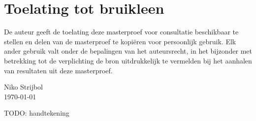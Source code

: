 \chapter*{Toelating tot bruikleen}

De auteur geeft de toelating deze masterproef voor consultatie beschikbaar te stellen en delen van de masterproef te kopiëren voor persoonlijk gebruik.
Elk ander gebruik valt onder de bepalingen van het auteursrecht, in het bijzonder met betrekking tot de verplichting de bron uitdrukkelijk te vermelden bij het aanhalen van resultaten uit deze masterproef.

Niko Strijbol \\
\today

TODO: handtekening